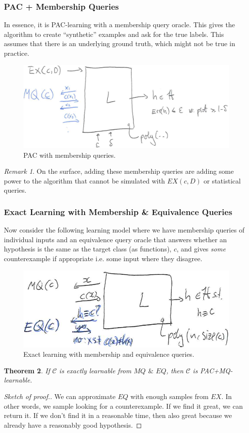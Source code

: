 \documentclass[12pt, letterpaper]{article}
\numberwithin{equation}{section} %
\newcommand{\mc}{\mathcal}
\newtheorem{theorem}{Theorem}[section]
\theoremstyle{definition}
\theoremstyle{remark}
\newtheorem{remark}[theorem]{Remark}
\begin{document}
\subsubsection*{PAC + Membership Queries}
In essence, it is PAC-learning with a membership query oracle. This gives the algorithm to create ``synthetic'' examples and ask for the true labels. This assumes that there is an underlying ground truth, which might not be true in practice.
\begin{figure}[H]
\centering
\includegraphics[width=0.6\linewidth]{img/pac-mq.png}
\caption{PAC with membership queries.}
\end{figure}
\begin{remark}
On the surface, adding these membership queries are adding some power to the algorithm that cannot be simulated with $EX(c, D)$ or statistical queries.
\end{remark}
\subsubsection*{Exact Learning with Membership \& Equivalence Queries}
Now consider the following learning model where we have membership queries of individual inputs and an equivalence query oracle that answers whether an hypothesis is the same as the target class (as functions), $c$, and gives \emph{some} counterexample if appropriate i.e. some input where they disagree.
\begin{figure}[H]
\centering
\includegraphics[width=0.6\linewidth]{img/pac-mq-eq.png}
\caption{Exact learning with membership and equivalence queries.}
\end{figure}

\begin{theorem}
If $\mc C$ is exactly learnable from $MQ$ $\&$ $EQ$, then $\mc C$ is PAC+MQ-learnable.
\end{theorem}
\begin{proof}[Sketch of proof.]
We can approximate $EQ$ with enough samples from $EX$. In other words, we sample looking for a counterexample. If we find it great, we can return it. If we don't find it in a reasonable time, then also great because we already have a reasonably good hypothesis.
\end{proof}
\end{document}
